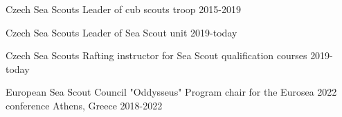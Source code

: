



\begin{cvpubs}
\end{cvpubs}


\begin{cvhonors}
  \cvhonor
    {Czech Sea Scouts} %
    {Leader of cub scouts troop} %
    {} %
    {2015-2019} %
    
  \cvhonor
    {Czech Sea Scouts} %
    {Leader of Sea Scout unit} %
    {} %
    {2019-today} %

  \cvhonor
    {Czech Sea Scouts} %
    {Rafting instructor for Sea Scout qualification courses} %
    {} %
    {2019-today} %

  \cvhonor
    {European Sea Scout Council "Oddysseus"} %
    {Program chair for the Eurosea 2022 conference} %
    {\hspace{-3em}Athens, Greece} %
    {2018-2022} %
    
\end{cvhonors}





